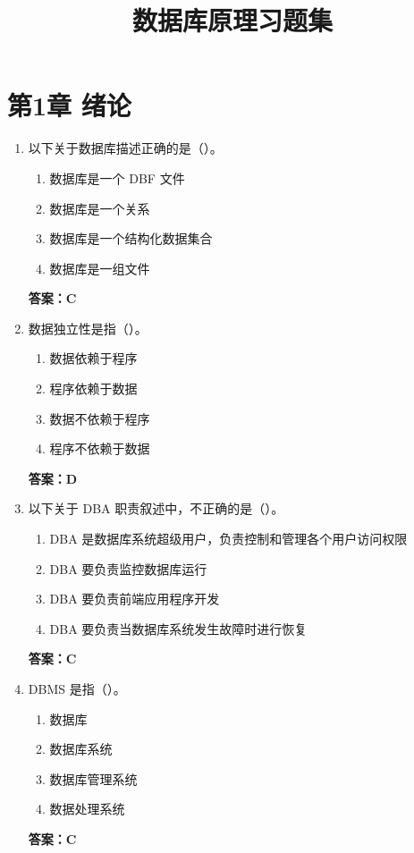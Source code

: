 \documentclass[12pt, a4paper]{article}
\date{}
\title{\textbf{数据库原理习题集}}
\begin{document}
\maketitle
\thispagestyle{empty}
\newpage

\section{第1章 绪论}

\begin{enumerate}[label=\arabic*.]
	\item 以下关于数据库描述正确的是（\quad）。
	      \begin{enumerate}
		      \item 数据库是一个 DBF 文件
		      \item 数据库是一个关系
		      \item 数据库是一个结构化数据集合
		      \item 数据库是一组文件
	      \end{enumerate}
	      \textbf{答案：C}

	\item 数据独立性是指（\quad）。
	      \begin{enumerate}
		      \item 数据依赖于程序
		      \item 程序依赖于数据
		      \item 数据不依赖于程序
		      \item 程序不依赖于数据
	      \end{enumerate}
	      \textbf{答案：D}

	\item 以下关于 DBA 职责叙述中，不正确的是（\quad）。
	      \begin{enumerate}
		      \item DBA 是数据库系统超级用户，负责控制和管理各个用户访问权限
		      \item DBA 要负责监控数据库运行
		      \item DBA 要负责前端应用程序开发
		      \item DBA 要负责当数据库系统发生故障时进行恢复
	      \end{enumerate}
	      \textbf{答案：C}

	\item DBMS 是指（\quad）。
	      \begin{enumerate}
		      \item 数据库
		      \item 数据库系统
		      \item 数据库管理系统
		      \item 数据处理系统
	      \end{enumerate}
	      \textbf{答案：C}


\end{enumerate}
\end{document}
